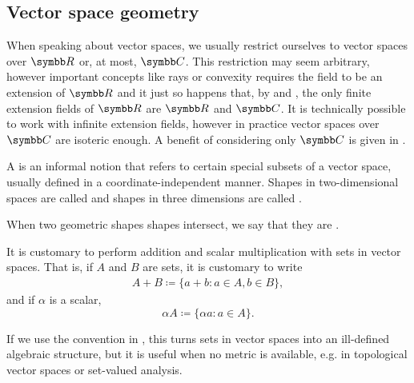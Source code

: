\subsection{Vector space geometry}\label{subsec:vector_space_geometry}

\begin{remark}\label{remark:real_field_extensions}
  When speaking about vector spaces, we usually restrict ourselves to vector spaces over \( \BR \) or, at most, \( \BC \). This restriction may seem arbitrary, however important concepts like rays or convexity requires the field to be an extension of \( \BR \) and it just so happens that, by  and , the only finite extension fields of \( \BR \) are \( \BR \) and \( \BC \). It is technically possible to work with infinite extension fields, however in practice vector spaces over \( \BC \) are isoteric enough. A benefit of considering only \( \BC \) is given in .
\end{remark}

\begin{definition}\label{def:geometric_shape}
  A  is an informal notion that refers to certain special subsets of a vector space, usually defined in a coordinate-independent manner. Shapes in two-dimensional spaces are called  and shapes in three dimensions are called .

  When two geometric shapes shapes intersect, we say that they are .
\end{definition}

\begin{remark}\label{remark:vector_space_set_operations}
  It is customary to perform addition and scalar multiplication with sets in vector spaces. That is, if \( A \) and \( B \) are sets, it is customary to write
  \begin{align*}
    A + B \coloneqq \{ a + b \colon a \in A, b \in B \},
  \end{align*}
  and if \( \alpha \) is a scalar,
  \begin{equation*}
    \alpha A \coloneqq \{ \alpha a \colon a \in A \}.
  \end{equation*}

  If we use the convention in , this turns sets in vector spaces into an ill-defined algebraic structure, but it is useful when no metric is available, e.g. in topological vector spaces or set-valued analysis.
\end{remark}

